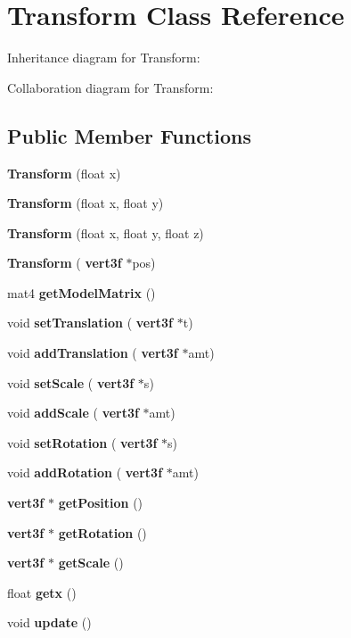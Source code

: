 \section{Transform Class Reference}
\label{class_transform}


Inheritance diagram for Transform\+:


Collaboration diagram for Transform\+:
\subsection*{Public Member Functions}
\begin{DoxyCompactItemize}
\item 
\mbox{\label{class_transform_a99d1aa66792547fd54dd64a123537bbf}} 
{\bfseries Transform} (float x)
\item 
\mbox{\label{class_transform_a9fb589a9cfea2025a8619666cbb76019}} 
{\bfseries Transform} (float x, float y)
\item 
\mbox{\label{class_transform_a52419fabf2513dbd10020e65b835a1f0}} 
{\bfseries Transform} (float x, float y, float z)
\item 
\mbox{\label{class_transform_a508dda488a523c053aeb8f6a03aa73ed}} 
{\bfseries Transform} (\textbf{ vert3f} $\ast$pos)
\item 
\mbox{\label{class_transform_a68757546d7f7f771349e69474176280e}} 
mat4 {\bfseries get\+Model\+Matrix} ()
\item 
\mbox{\label{class_transform_aa09bf254e5fb90305e01452944f37815}} 
void {\bfseries set\+Translation} (\textbf{ vert3f} $\ast$t)
\item 
\mbox{\label{class_transform_a7d2bce215ce5e95581815bd634365e98}} 
void {\bfseries add\+Translation} (\textbf{ vert3f} $\ast$amt)
\item 
\mbox{\label{class_transform_ace6df388174053076619b3d00c7f349d}} 
void {\bfseries set\+Scale} (\textbf{ vert3f} $\ast$s)
\item 
\mbox{\label{class_transform_a3fb47365b0ae609cabf3afe473ce8deb}} 
void {\bfseries add\+Scale} (\textbf{ vert3f} $\ast$amt)
\item 
\mbox{\label{class_transform_ae60647379bbabbd3de33bed5e696cc23}} 
void {\bfseries set\+Rotation} (\textbf{ vert3f} $\ast$s)
\item 
\mbox{\label{class_transform_a4cc3f36def48c08245a7155285b95680}} 
void {\bfseries add\+Rotation} (\textbf{ vert3f} $\ast$amt)
\item 
\mbox{\label{class_transform_a9646131efab2de12e907ef8a1455bd91}} 
\textbf{ vert3f} $\ast$ {\bfseries get\+Position} ()
\item 
\mbox{\label{class_transform_a644e8b3c6f9cdabd467b83c26558ef2e}} 
\textbf{ vert3f} $\ast$ {\bfseries get\+Rotation} ()
\item 
\mbox{\label{class_transform_a5f662ff36040506243c9f97b62024412}} 
\textbf{ vert3f} $\ast$ {\bfseries get\+Scale} ()
\item 
\mbox{\label{class_transform_aa830fc771ce781522dbb5db9c77ece3b}} 
float {\bfseries getx} ()
\item 
\mbox{\label{class_transform_a377194ad810fc2e6d05e3008eb8c7655}} 
void {\bfseries update} ()
\end{DoxyCompactItemize}


